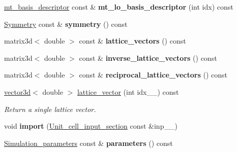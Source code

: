 \begin{DoxyCompactItemize}
\item 
\hypertarget{classsirius_1_1_unit__cell_a70d01faceb362695b6bae75e0d54028c}{}\hyperlink{structmt__basis__descriptor}{mt\+\_\+basis\+\_\+descriptor} const \& {\bfseries mt\+\_\+lo\+\_\+basis\+\_\+descriptor} (int idx) const \label{classsirius_1_1_unit__cell_a70d01faceb362695b6bae75e0d54028c}

\item 
\hypertarget{classsirius_1_1_unit__cell_a0f6f4bf2a8528e3dfbd308d77280727f}{}\hyperlink{classsirius_1_1_symmetry}{Symmetry} const \& {\bfseries symmetry} () const \label{classsirius_1_1_unit__cell_a0f6f4bf2a8528e3dfbd308d77280727f}

\item 
\hypertarget{classsirius_1_1_unit__cell_ad9fa0c4c075f6956dfaf28b7dc224977}{}matrix3d$<$ double $>$ const \& {\bfseries lattice\+\_\+vectors} () const \label{classsirius_1_1_unit__cell_ad9fa0c4c075f6956dfaf28b7dc224977}

\item 
\hypertarget{classsirius_1_1_unit__cell_a5e9e6fe91f2c2f53931461cf38d174de}{}matrix3d$<$ double $>$ const \& {\bfseries inverse\+\_\+lattice\+\_\+vectors} () const \label{classsirius_1_1_unit__cell_a5e9e6fe91f2c2f53931461cf38d174de}

\item 
\hypertarget{classsirius_1_1_unit__cell_a0bae03235deb7e9e5e5547feddded4c9}{}matrix3d$<$ double $>$ const \& {\bfseries reciprocal\+\_\+lattice\+\_\+vectors} () const \label{classsirius_1_1_unit__cell_a0bae03235deb7e9e5e5547feddded4c9}

\item 
\hyperlink{classgeometry3d_1_1vector3d}{vector3d}$<$ double $>$ \hyperlink{classsirius_1_1_unit__cell_a089cf19886c5eeeb6e51e9fdca735bfb}{lattice\+\_\+vector} (int idx\+\_\+\+\_\+) const 
\begin{DoxyCompactList}\small\item\em Return a single lattice vector. \end{DoxyCompactList}\item 
\hypertarget{classsirius_1_1_unit__cell_a2b84cad00aa92d04393a3a38de1b3133}{}void {\bfseries import} (\hyperlink{structsirius_1_1_unit__cell__input__section}{Unit\+\_\+cell\+\_\+input\+\_\+section} const \&inp\+\_\+\+\_\+)\label{classsirius_1_1_unit__cell_a2b84cad00aa92d04393a3a38de1b3133}

\item 
\hypertarget{classsirius_1_1_unit__cell_aec9f876ce00030c1e877f9e8c356b900}{}\hyperlink{classsirius_1_1_simulation__parameters}{Simulation\+\_\+parameters} const \& {\bfseries parameters} () const \label{classsirius_1_1_unit__cell_aec9f876ce00030c1e877f9e8c356b900}

\end{DoxyCompactItemize}
